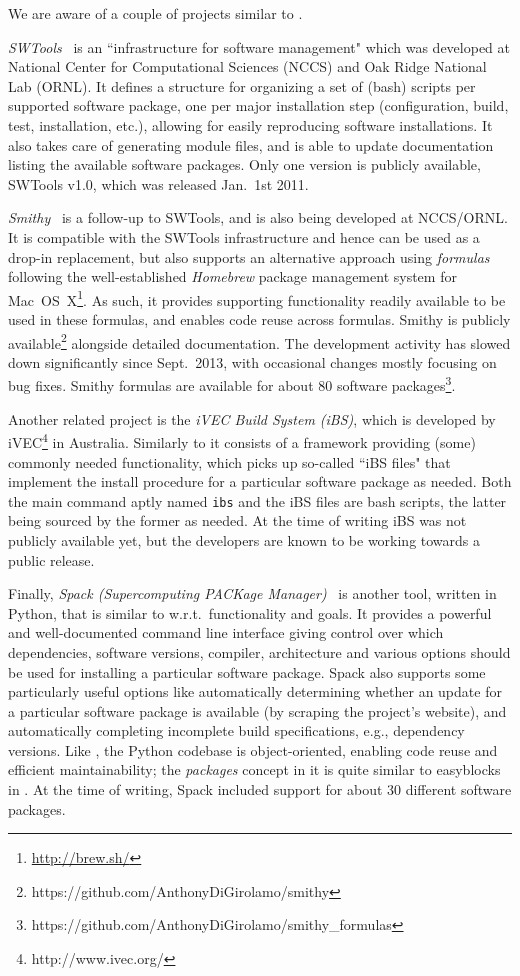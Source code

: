 We are aware of a couple of projects similar to \easybuild{}.

\emph{SWTools}~\cite{swtools, jones08} is an ``infrastructure for software
management" which was developed at National Center for Computational Sciences (NCCS)
and Oak Ridge National Lab (ORNL). It defines a structure for organizing a set of
(bash) scripts per supported software package, one per major installation step
(configuration, build, test, installation, etc.), allowing for easily reproducing 
software installations. It also takes care of generating module files, and is
able to update documentation listing the available software packages.
Only one version is publicly available, SWTools v1.0, which was released Jan.~1st 2011.

\emph{Smithy}~\cite{smithy} is a follow-up to SWTools, and is also being developed
at NCCS/ORNL. It is compatible with the SWTools infrastructure and hence can be
used as a drop-in replacement, but also supports an alternative approach using
\emph{formulas} following the well-established \emph{Homebrew} package management 
system for Mac~OS~X\footnote{\url{http://brew.sh/}}. As such, it provides
supporting functionality readily available to be used in these formulas, and enables
code reuse across formulas. Smithy is publicly
available\footnote{https://github.com/AnthonyDiGirolamo/smithy} alongside detailed
documentation. The development activity has slowed down significantly since
Sept.~2013, with occasional changes mostly focusing on bug fixes.
Smithy formulas are available for about 80 software
packages\footnote{https://github.com/AnthonyDiGirolamo/smithy\_formulas}.

Another related project is the \emph{iVEC Build System (iBS)}, which is developed 
by iVEC\footnote{http://www.ivec.org/} in Australia. Similarly to \easybuild{}
it consists of a framework providing (some) commonly needed functionality, which
picks up so-called ``iBS files" that implement the install procedure for a 
particular software package as needed. Both the main command aptly named
\texttt{\small ibs} and the iBS files are bash scripts, the latter being sourced by
the former as needed. At the time of writing iBS was not publicly available yet, but
the developers are known to be working towards a public release.

Finally, \emph{Spack (Supercomputing PACKage Manager)}~\cite{spack} is another
tool, written in Python, that is similar to \easybuild{} w.r.t.\ functionality and
goals. It provides a powerful and well-documented command line interface giving
control over which dependencies, software versions, compiler, architecture and
various options should be used for installing a particular software package.
Spack also supports some particularly useful options like automatically determining
whether an update for a particular software package is available
(by scraping the project's website), and automatically completing
incomplete build specifications, e.g., dependency versions. Like
\easybuild{}, the Python codebase is object-oriented, enabling code reuse and
efficient maintainability; the \emph{packages} concept in it is quite similar to
easyblocks in \easybuild{}. At the time of writing, Spack included support for about
30 different software packages.


